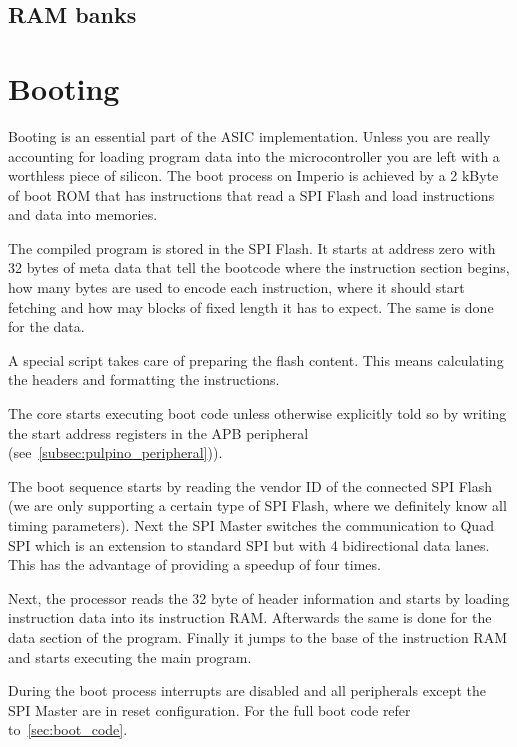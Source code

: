 \subsection{RAM banks}

\section{Booting}

Booting is an essential part of the ASIC implementation. Unless you are really accounting for loading program data into the microcontroller you are left with a worthless piece of silicon. The boot process on Imperio is achieved by a 2 kByte of boot ROM that has instructions that read a SPI Flash and load instructions and data into memories.

The compiled program is stored in the SPI Flash. It starts at address zero with 32 bytes of meta data that tell the bootcode where the instruction section begins, how many bytes are used to encode each instruction, where it should start fetching and how may blocks of fixed length it has to expect. The same is done for the data.

A special script takes care of preparing the flash content. This means calculating the headers and formatting the instructions.

The core starts executing boot code unless otherwise explicitly told so by writing the start address registers in the \pulpino APB peripheral (see~\ref{subsec:pulpino_peripheral})). 

The boot sequence starts by reading the vendor ID of the connected SPI Flash (we are only supporting a certain type of SPI Flash, where we definitely know all timing parameters). Next the SPI Master switches the communication to Quad SPI which is an extension to standard SPI but with 4 bidirectional data lanes. This has the advantage of providing a speedup of four times.

Next, the processor reads the 32 byte of header information and starts by loading instruction data into its instruction RAM. Afterwards the same is done for the data section of the program. Finally it jumps to the base of the instruction RAM and starts executing the main program.

During the boot process interrupts are disabled and all peripherals except the SPI Master are in reset configuration. For the full boot code refer to~\ref{sec:boot_code}.

\label{sec:booting}


